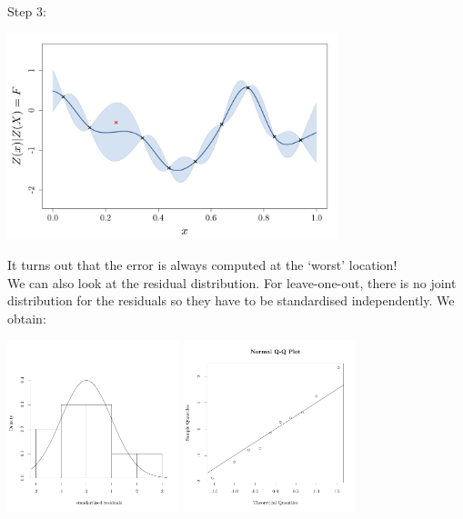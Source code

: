 \documentclass{beamer}
\begin{document}
\begin{frame}{}
Step 3:\\ \vspace{3mm}
\begin{center}
\includegraphics[height=6cm]{figures/R/VALID_crossval3}
\end{center}
\end{frame}

\begin{frame}{}
It turns out that the error is always computed at the `worst' location!\\ \vspace{5mm}
We can also look at the residual distribution. For leave-one-out, there is no joint distribution for the residuals so they have to be standardised independently. We obtain: 
\begin{center}
\includegraphics[height=5cm]{figures/R/VALID_crossvalhist} \qquad
\includegraphics[height=5cm]{figures/R/VALID_crossvalqqplot}
\end{center}
\end{frame}
\end{document}
